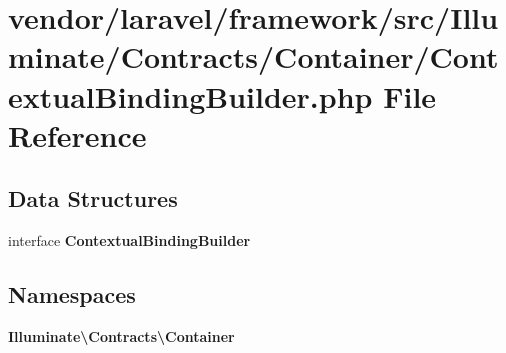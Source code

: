 \section{vendor/laravel/framework/src/\+Illuminate/\+Contracts/\+Container/\+Contextual\+Binding\+Builder.php File Reference}
\label{_contracts_2_container_2_contextual_binding_builder_8php}
\subsection*{Data Structures}
\begin{DoxyCompactItemize}
\item 
interface {\bf Contextual\+Binding\+Builder}
\end{DoxyCompactItemize}
\subsection*{Namespaces}
\begin{DoxyCompactItemize}
\item 
 {\bf Illuminate\textbackslash{}\+Contracts\textbackslash{}\+Container}
\end{DoxyCompactItemize}
